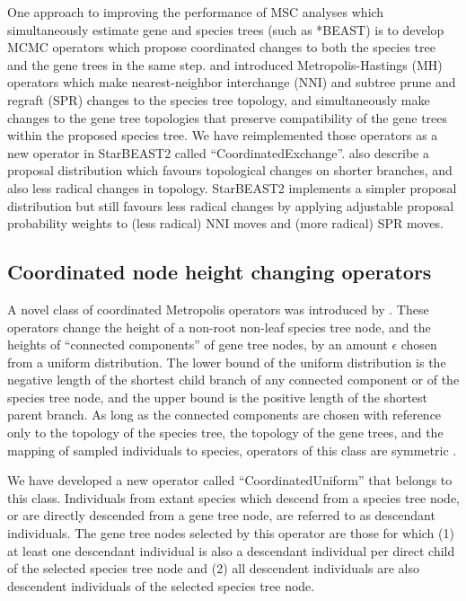 \documentclass[nogrid]{MBE}%
\begin{document}
One approach to improving the performance of MSC analyses which simultaneously
estimate gene and species trees (such as *BEAST) is to develop MCMC operators
which propose coordinated changes to both the species tree and the gene trees in
the same step. \cite{Yang01122014} and \cite{2015arXiv151203843R} introduced
Metropolis-Hastings (MH) operators which make nearest-neighbor interchange (NNI) and subtree prune and regraft (SPR) changes to the species
tree topology, and simultaneously make changes to the gene tree topologies that
preserve compatibility of the gene trees within the proposed species tree. We have
reimplemented those operators as a new operator in StarBEAST2 called
``CoordinatedExchange''. \cite{2015arXiv151203843R} also describe a proposal
distribution which favours topological changes on shorter branches, and also
less radical changes in topology. StarBEAST2 implements a simpler proposal
distribution but still favours less radical changes by applying adjustable
proposal probability weights to (less radical) NNI moves and (more radical) SPR
moves.

\subsection{Coordinated node height changing operators}

A novel class of coordinated Metropolis operators was introduced by
\cite{Jones010199}. These operators change the height of a non-root non-leaf
species tree node, and the heights of ``connected components'' of gene tree
nodes, by an amount $\epsilon$ chosen from a uniform distribution.
The lower bound of the uniform distribution is the negative length of
the shortest child branch of any connected component or of the species tree node,
and the upper bound is the positive length of the shortest parent branch. As
long as the connected components are chosen with reference only to the topology
of the species tree, the topology of the gene trees, and the mapping of
sampled individuals to species, operators of this class are symmetric
\citep{Jones010199}.

We have developed a new operator called ``CoordinatedUniform'' that belongs to
this class. Individuals from extant species which descend from a species tree
node, or are directly descended from a gene tree node, are referred to as
descendant individuals. The gene tree nodes selected by this operator are those
for which (1) at least one descendant individual is also a descendant individual
per direct child of the selected species tree node and (2) all descendent
individuals are also descendent individuals of the selected species tree node.
\end{document}
